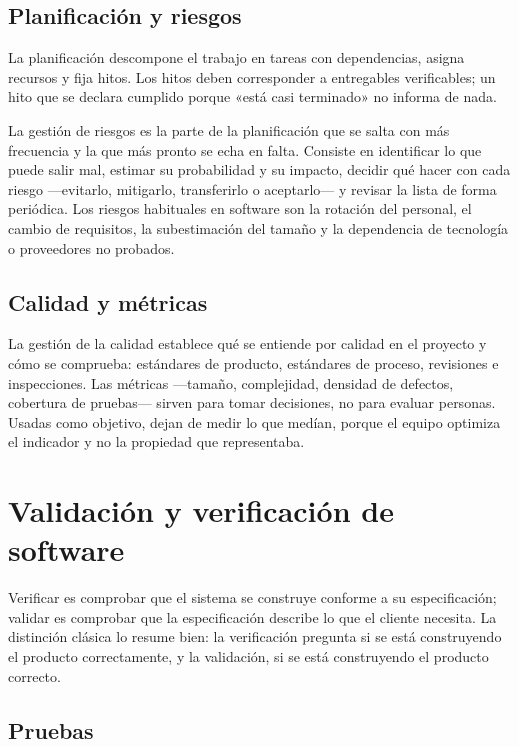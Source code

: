 \subsection*{Planificación y riesgos}

La planificación descompone el trabajo en tareas con dependencias, asigna
recursos y fija hitos. Los hitos deben corresponder a entregables verificables;
un hito que se declara cumplido porque «está casi terminado» no informa de nada.

La gestión de riesgos es la parte de la planificación que se salta con más
frecuencia y la que más pronto se echa en falta. Consiste en identificar lo que
puede salir mal, estimar su probabilidad y su impacto, decidir qué hacer con cada
riesgo —evitarlo, mitigarlo, transferirlo o aceptarlo— y revisar la lista de forma
periódica. Los riesgos habituales en software son la rotación del personal, el
cambio de requisitos, la subestimación del tamaño y la dependencia de tecnología
o proveedores no probados.

\subsection*{Calidad y métricas}

La gestión de la calidad establece qué se entiende por calidad en el proyecto y
cómo se comprueba: estándares de producto, estándares de proceso, revisiones e
inspecciones. Las métricas —tamaño, complejidad, densidad de defectos, cobertura
de pruebas— sirven para tomar decisiones, no para evaluar personas. Usadas como
objetivo, dejan de medir lo que medían, porque el equipo optimiza el indicador y
no la propiedad que representaba.

\section{Validación y verificación de software}

Verificar es comprobar que el sistema se construye conforme a su especificación;
validar es comprobar que la especificación describe lo que el cliente necesita. La
distinción clásica lo resume bien: la verificación pregunta si se está
construyendo el producto correctamente, y la validación, si se está construyendo
el producto correcto.

\subsection*{Pruebas}

